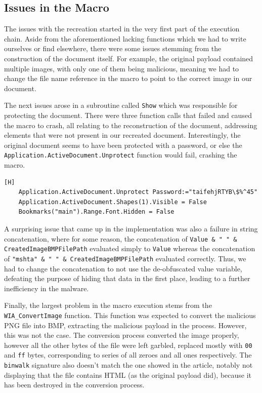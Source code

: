 \subsection{Issues in the Macro}
The issues with the recreation started in the very first part of the execution chain. Aside from the aforementioned
lacking functions which we had to write ourselves or find elsewhere, there were some issues stemming from the
construction of the document itself. For example, the original payload contained multiple images, with only one of them
being malicious, meaning we had to change the file name reference in the macro to point to the correct image in our
document.

The next issues arose in a subroutine called \verb+Show+ which was responsible for protecting the document. There were
three function calls that failed and caused the macro to crash, all relating to the reconstruction of the document,
addressing elements that were not present in our recreated document. Interestingly, the original document seems to have
been protected with a password, or else the \verb+Application.ActiveDocument.Unprotect+ function would fail, crashing
the macro.

\begin{lstlisting}[language=VBScript, caption={Failing function calls from the document protection subroutine}][H]
    Application.ActiveDocument.Unprotect Password:="taifehjRTYB\$%^45"
    Application.ActiveDocument.Shapes(1).Visible = False
    Bookmarks("main").Range.Font.Hidden = False
\end{lstlisting}

A surprising issue that came up in the implementation was also a failure in string concatenation, where for some reason,
the concatenation of \verb+Value & " " & CreatedImageBMPFilePath+ evaluated simply to \verb+Value+ whereas the
concatenation of \verb+"mshta" & " " & CreatedImageBMPFilePath+ evaluated correctly. Thus, we had to change the
concatenation to not use the de-obfuscated value variable, defeating the purpose of hiding that data in the first place,
leading to a further inefficiency in the malware.

Finally, the largest problem in the macro execution stems from the \verb+WIA_ConvertImage+ function. This function was
expected to convert the malicious \acrshort{PNG} file into \acrshort{BMP}, extracting the malicious payload in the
process. However, this was not the case. The conversion process converted the image properly, however all the other
bytes of the file were left garbled, replaced mostly with \verb+00+ and \verb+ff+ bytes, corresponding to series of
all zeroes and all ones respectively. The \verb+binwalk+ signature also doesn't match the one showed in the article,
notably not displaying that the file contains \acrshort{HTML} (as the original payload did), because it has been 
destroyed in the conversion process.

